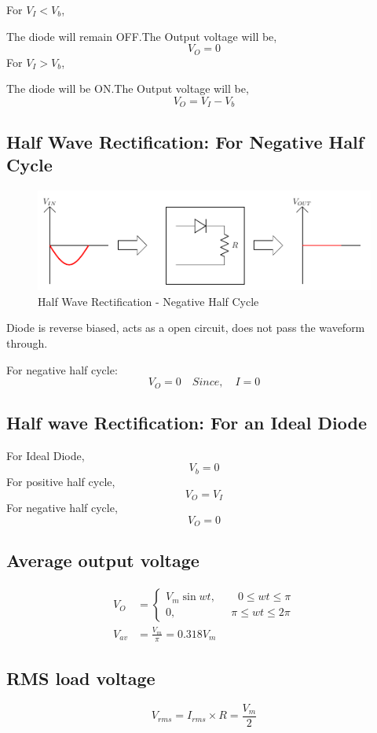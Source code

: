 			For $V_I<V_b$,
			
			The diode will remain OFF.The Output voltage will be,
			$$V_O =0$$
			For $V_I>V_b$,
			
			The diode will be ON.The Output voltage will be,
			$$V_O = V_I- V_b$$
		
		\subsection{Half Wave Rectification: For Negative Half Cycle}
			\begin{figure}[h]
				\centering
				\includegraphics[width=0.9\linewidth]{img/exp6/7}
				\caption{Half Wave Rectification - Negative Half Cycle}
				\label{fig:rfhwnhc}
			\end{figure}
			Diode is reverse biased, acts as a open circuit, does not pass the waveform through.
			
			For negative half cycle:
			$$V_O=0 \quad Since, \quad I =0$$
		
		\subsection{Half wave Rectification: For an Ideal Diode}
			For Ideal Diode,
			$$V_b = 0$$
			For positive half cycle,
			$$V_O = V_I$$
			For negative half cycle,
			$$V_O = 0$$
			
		\subsection{Average output voltage}	
			\begin{align*}
				V_O &= \begin{cases} 
					V_m \sin wt, \quad\quad 0 \leq wt \leq \pi\\
					0, \quad\quad\quad\quad\quad \pi \leq wt \leq 2 \pi
				\end{cases}\\
				V_{av} &= \frac{V_m}{\pi} =0.318V_m
			\end{align*}
		
		\subsection{RMS load voltage}			
			$$V_{rms}=I_{rms} \times R = \frac {V_m}{2}$$
		
